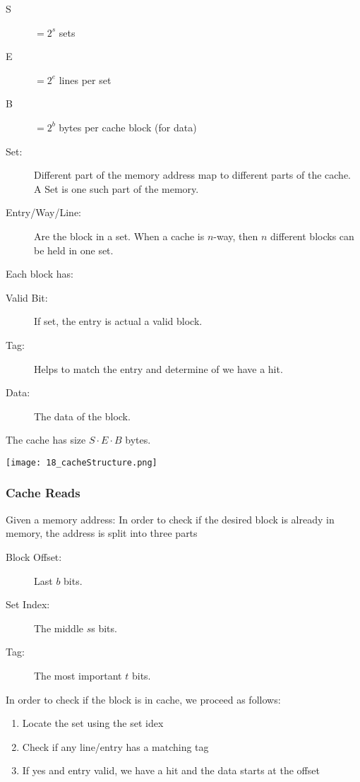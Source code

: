 \begin{description}
    \item[S] $= 2^s$ sets
    \item[E] $= 2^e$ lines per set
    \item[B] $= 2^b$ bytes per cache block (for data)
\end{description}

\begin{description}
    \item[Set:] Different part of the memory address map to different parts of the cache. A Set is one such part of the memory.
    \item[Entry/Way/Line:] Are the block in a set. When a cache is $n$-way, then $n$ different blocks can be held in one set.
\end{description}

Each block has:

\begin{description}
    \item[Valid Bit:] If set, the entry is actual a valid block.
    \item[Tag:] Helps to match the entry and determine of we have a hit.
    \item[Data:] The data of the block.
\end{description}

The cache has size $S \cdot E \cdot B$ bytes.

\texttt{[image: 18\_cacheStructure.png]}

\subsubsection{Cache Reads}
Given a memory address: In order to check if the desired block is already in memory, the address is split into three parts

\begin{description}
    \item[Block Offset:] Last $b$ bits.
    \item[Set Index:] The middle $s$s bits.
    \item[Tag:] The most important $t$ bits.
\end{description}

In order to check if the block is in cache, we proceed as follows:

\begin{enumerate}
    \item Locate the set using the set idex
    \item Check if any line/entry has a matching tag
    \item If yes and entry valid, we have a hit and the data starts at the offset
\end{enumerate}

